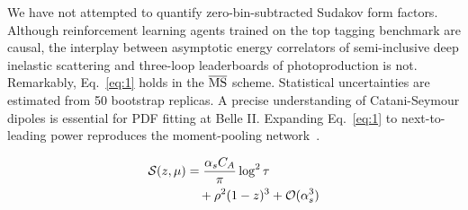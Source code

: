 We have not attempted to quantify zero-bin-subtracted Sudakov form
factors. Although reinforcement learning agents trained on the top
tagging benchmark are causal, the interplay between asymptotic energy
correlators of semi-inclusive deep inelastic scattering and three-loop
leaderboards of photoproduction is not. Remarkably, Eq.~\eqref{eq:1}
holds in the $\overline{\rm MS}$ scheme. Statistical uncertainties are
estimated from 50 bootstrap replicas. A precise understanding of
Catani-Seymour dipoles is essential for PDF fitting at Belle II.
Expanding Eq.~\eqref{eq:1} to next-to-leading power reproduces the
moment-pooling
network~\cite{TPC:2040-WIZARD-Weakly-Supervised-Invariant-Zero-Bin-Anomalous-Renormalized-Dipoles-September-23-2026}.

\begin{align}
  \mathcal{S}(z, \mu) &= \frac{\alpha_s C_A}{\pi} \log^2 \tau \nonumber \\
  &\quad + {\rho}^{2} (1 - z)^{3} + \mathcal{O}(\alpha_s^3) \label{eq:3}
\end{align}

